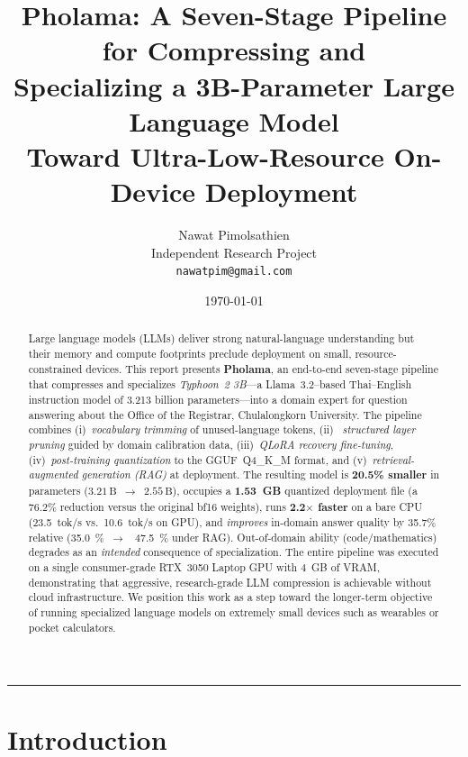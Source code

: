 \documentclass[11pt,a4paper]{article}
\title{\textbf{Pholama: A Seven-Stage Pipeline for Compressing and\\
Specializing a 3B-Parameter Large Language Model\\
Toward Ultra-Low-Resource On-Device Deployment}}
\author{
  Nawat Pimolsathien\\
  \small Independent Research Project\\
  \small \texttt{nawatpim@gmail.com}
}
\date{\today}
\newcommand{\param}[1]{\ensuremath{#1\,\text{B}}}
\begin{document}
\maketitle
\thispagestyle{empty}

\begin{abstract}
\noindent
Large language models (LLMs) deliver strong natural-language understanding
but their memory and compute footprints preclude deployment on small,
resource-constrained devices. This report presents \textbf{Pholama}, an
end-to-end seven-stage pipeline that compresses and specializes
\emph{Typhoon~2 3B}---a Llama~3.2--based Thai--English instruction model of
\num{3.213} billion parameters---into a domain expert for question answering
about the Office of the Registrar, Chulalongkorn University. The pipeline
combines (i)~\emph{vocabulary trimming} of unused-language tokens, (ii)~%
\emph{structured layer pruning} guided by domain calibration data,
(iii)~\emph{QLoRA recovery fine-tuning}, (iv)~\emph{post-training
quantization} to the GGUF~Q4\_K\_M format, and (v)~\emph{retrieval-augmented
generation (RAG)} at deployment. The resulting model is \textbf{20.5\%
smaller} in parameters (\param{3.21}~$\rightarrow$~\param{2.55}), occupies a
\textbf{1.53~GB} quantized deployment file (a 76.2\% reduction versus the
original bf16 weights), runs \textbf{2.2$\times$ faster} on a bare CPU
(\SI{23.5}{tok/s} vs.\ \SI{10.6}{tok/s} on GPU), and \emph{improves}
in-domain answer quality by 35.7\% relative (\SI{35.0}{\percent}~$\rightarrow$~%
\SI{47.5}{\percent} under RAG). Out-of-domain ability (code/mathematics)
degrades as an \emph{intended} consequence of specialization. The entire
pipeline was executed on a single consumer-grade RTX~3050 Laptop GPU with
\SI{4}{GB} of VRAM, demonstrating that aggressive, research-grade LLM
compression is achievable without cloud infrastructure. We position this work
as a step toward the longer-term objective of running specialized language
models on extremely small devices such as wearables or pocket calculators.
\end{abstract}

\tableofcontents
\bigskip
\hrule
\bigskip

\section{Introduction}
\label{sec:intro}
\end{document}
